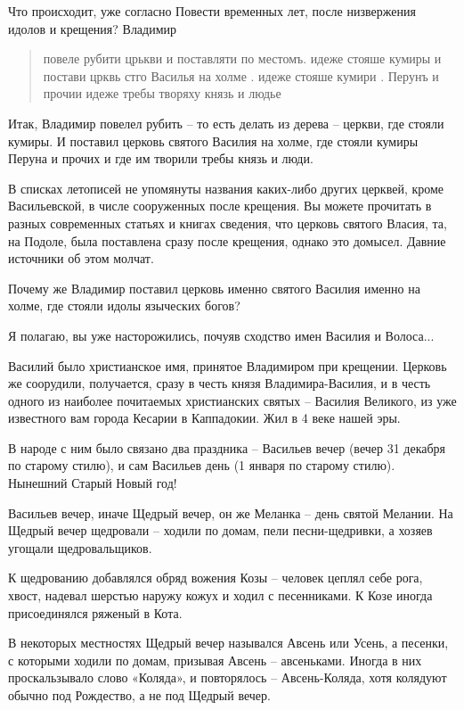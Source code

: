    Что происходит, уже согласно Повести временных лет, после низвержения идолов и крещения? Владимир 

\begin{quotation}
повеле рубити црькви и поставляти по местомъ. идеже стояше кумиры и постави црквь стго Василья на холме . идеже стояше кумири . Перунъ и прочии идеже требы творяху князь и людье
\end{quotation}

Итак, Владимир повелел рубить – то есть делать из дерева – церкви, где стояли кумиры. И поставил церковь святого Василия на холме, где стояли кумиры Перуна и прочих и где им творили требы князь и люди.

   В списках летописей не упомянуты названия каких-либо других церквей, кроме Васильевской, в числе сооруженных после крещения. Вы можете прочитать в разных современных статьях и книгах сведения, что церковь святого Власия, та, на Подоле, была поставлена сразу после крещения, однако это домысел. Давние источники об этом молчат.

   Почему же Владимир поставил церковь именно святого Василия именно на холме, где стояли идолы языческих богов?

   Я полагаю, вы уже насторожились, почуяв сходство имен Василия и Волоса...

   Василий было христианское имя, принятое Владимиром при крещении. Церковь же соорудили, получается, сразу в честь князя Владимира-Василия, и в честь одного из наиболее почитаемых христианских святых – Василия Великого, из уже известного вам города Кесарии в Каппадокии. Жил в 4 веке нашей эры.

   В народе с ним было связано два праздника – Васильев вечер (вечер 31 декабря по старому стилю), и сам Васильев день (1 января по старому стилю). Нынешний Старый Новый год!

   Васильев вечер, иначе Щедрый вечер, он же Меланка – день святой Мелании. На Щедрый вечер щедровали – ходили по домам, пели песни-щедривки, а хозяев угощали щедровальщиков.

К щедрованию добавлялся обряд вожения Козы – человек цеплял себе рога, хвост, надевал шерстью наружу кожух и ходил с песенниками. К Козе иногда присоединялся ряженый в Кота.

В некоторых местностях Щедрый вечер назывался Авсень или Усень, а песенки, с которыми ходили по домам, призывая Авсень – авсеньками. Иногда в них проскальзывало слово «Коляда», и повторялось – Авсень-Коляда, хотя колядуют обычно под Рождество, а не под Щедрый вечер. 

